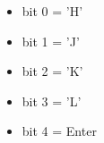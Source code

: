 \begin{itemize}
\item[] bit 0 = 'H'
\item[] bit 1 = 'J'
\item[] bit 2 = 'K'
\item[] bit 3 = 'L'
\item[] bit 4 = Enter
\end{itemize}

